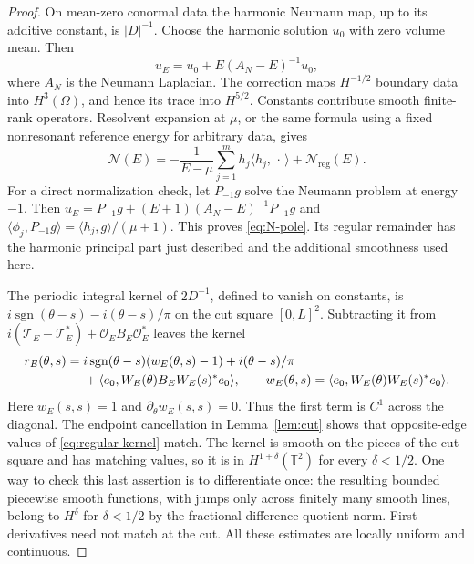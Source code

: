 \documentclass[11pt]{amsart}
\numberwithin{equation}{section}
\newcommand{\T}{\mathbb T}
\newcommand{\OO}{\mathcal O}
\newcommand{\TT}{\mathcal T}
\newcommand{\NN}{\mathcal N}
\newcommand{\ip}[2]{\langle #1,#2\rangle}
\begin{document}
\begin{proof}
On mean-zero conormal data the harmonic Neumann map, up to its additive
constant, is $|D|^{-1}$. Choose the harmonic solution $u_0$ with zero
volume mean. Then
\begin{equation}\label{eq:harmonic-comparison}
 u_E=u_0+E(A_N-E)^{-1}u_0,
\end{equation}
where $A_N$ is the Neumann Laplacian. The correction maps
$H^{-1/2}$ boundary data into $H^3(\Omega)$, and hence its trace into
$H^{5/2}$. Constants contribute smooth finite-rank operators. Resolvent
expansion at $\mu$, or the same formula using a fixed nonresonant
reference energy for arbitrary data, gives
\begin{equation}\label{eq:N-pole}
 \NN(E)=-\frac1{E-\mu}\sum_{j=1}^m h_j\ip{h_j}{\,\cdot\,}
                       +\NN_{\mathrm{reg}}(E).
\end{equation}
For a direct normalization check, let $P_{-1}g$ solve the Neumann problem
at energy $-1$. Then
$u_E=P_{-1}g+(E+1)(A_N-E)^{-1}P_{-1}g$ and
$\ip{\phi_j}{P_{-1}g}=\ip{h_j}g/(\mu+1)$.
This proves \eqref{eq:N-pole}. Its regular remainder has the harmonic
principal part just described and the additional smoothness used here.

The periodic integral kernel of $2D^{-1}$, defined to vanish on constants,
is $i\operatorname{sgn}(\theta-s)-i(\theta-s)/\pi$ on the cut square $[0,L]^2$.
Subtracting it from $i(\TT_E-\TT_E^*)+\OO_EB_E\OO_E^*$ leaves the kernel
\begin{align}\label{eq:regular-kernel}
 r_E(\theta,s)={}&i\operatorname{sgn}(\theta-s)(w_E(\theta,s)-1)
                  +i(\theta-s)/\pi\notag\\
 &+\ip{e_0}{W_E(\theta)B_EW_E(s)^*e_0},
 \qquad w_E(\theta,s)=\ip{e_0}{W_E(\theta)W_E(s)^*e_0}.
\end{align}
Here $w_E(s,s)=1$ and $\partial_\theta w_E(s,s)=0$. Thus the first term
is $C^1$ across the diagonal. The endpoint cancellation in
Lemma~\ref{lem:cut} shows that opposite-edge values of \eqref{eq:regular-kernel}
match. The kernel is smooth on the pieces of the cut square and has
matching values, so it is in $H^{1+\delta}(\T^2)$ for every $\delta<1/2$.
One way to check this last assertion is to differentiate once: the
resulting bounded piecewise smooth functions, with jumps only across
finitely many smooth lines, belong to $H^\delta$ for $\delta<1/2$ by
the fractional difference-quotient norm. First derivatives need not
match at the cut. All these estimates are locally uniform and continuous.


\end{proof}
\end{document}
